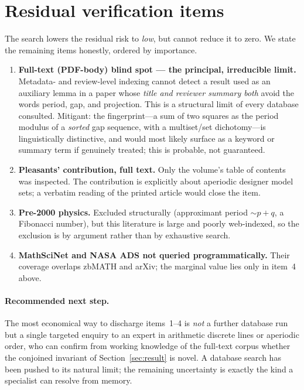\documentclass[11pt]{article}
\theoremstyle{plain}
\theoremstyle{remark}
\begin{document}
\section{Residual verification items}\label{sec:residual}

The search lowers the residual risk to \emph{low}, but cannot reduce it to zero. We
state the remaining items honestly, ordered by importance.

\begin{enumerate}[leftmargin=2.0em,itemsep=4pt]
  \item \textbf{Full-text (PDF-body) blind spot --- the principal, irreducible
        limit.} Metadata- and review-level indexing cannot detect a result used as
        an auxiliary lemma in a paper whose \emph{title and reviewer summary both}
        avoid the words period, gap, and projection. This is a structural limit of
        every database consulted. Mitigant: the fingerprint---a sum of two squares
        as the period modulus of a \emph{sorted} gap sequence, with a multiset/set
        dichotomy---is linguistically distinctive, and would most likely surface as
        a keyword or summary term if genuinely treated; this is probable, not
        guaranteed.
  \item \textbf{Pleasants' contribution, full text.} Only the volume's table of
        contents was inspected. The contribution is explicitly about aperiodic
        designer model sets; a verbatim reading of the printed article would close
        the item.
  \item \textbf{Pre-2000 physics.} Excluded structurally (approximant period
        $\sim p+q$, a Fibonacci number), but this literature is large and poorly
        web-indexed, so the exclusion is by argument rather than by exhaustive
        search.
  \item \textbf{MathSciNet and NASA ADS not queried programmatically.} Their
        coverage overlaps zbMATH and arXiv; the marginal value lies only in
        item~4 above.
\end{enumerate}

\paragraph{Recommended next step.}
The most economical way to discharge items~1--4 is \emph{not} a further database run
but a single targeted enquiry to an expert in arithmetic discrete lines or aperiodic
order, who can confirm from working knowledge of the full-text corpus whether the
conjoined invariant of Section~\ref{sec:result} is novel. A database search has been
pushed to its natural limit; the remaining uncertainty is exactly the kind a
specialist can resolve from memory.
\end{document}
